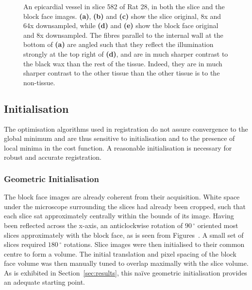 \begin{figure}
      \caption{An epicardial vessel in slice 582 of Rat 28, in both the slice and the block face images. \textbf{(a)}, \textbf{(b)} and \textbf{(c)} show the slice original, 8x and 64x downsampled, while \textbf{(d)} and \textbf{(e)} show the block face original and 8x downsampled. The fibres parallel to the internal wall at the bottom of \textbf{(a)} are angled such that they reflect the illumination strongly at the top right of \textbf{(d)}, and are in much sharper contrast to the black wax than the rest of the tissue. Indeed, they are in much sharper contrast to the other tissue than the other tissue is to the non-tissue.}
      \label{fig:downsample_zooms}
    \end{figure}
  
  \subsection{Initialisation} %
  \label{sub:initialisation}
    The optimisation algorithms used in registration do not assure convergence to the global minimum and are thus sensitive to initialisation and to the presence of local minima in the cost function. A reasonable initialisation is necessary for robust and accurate registration.
	
		\subsubsection{Geometric Initialisation} %
		\label{ssub:geometric_initialisation}
			The block face images are already coherent from their acquisition. White space under the microscope surrounding the slices had already been cropped, such that each slice sat approximately centrally within the bounds of its image. Having been reflected across the x-axis, an anticlockwise rotation of $90\,^{\circ}$ oriented most slices approximately with the block face, as is seen from Figures~. A small set of slices required $180\,^{\circ}$ rotations. Slice images were then initialised to their common centre to form a volume. The initial translation and pixel spacing of the block face volume was then manually tuned to overlap maximally with the slice volume. As is exhibited in Section~\ref{sec:results}, this naïve geometric initialisation provides an adequate starting point.
	
